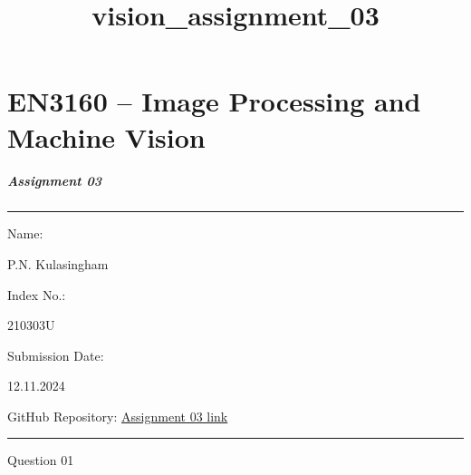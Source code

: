 \documentclass[11pt]{article}
\title{vision\_assignment\_03}
\begin{document}
    
    \maketitle
    
    

    
    \section{\texorpdfstring{\textbf{EN3160 -- Image Processing and Machine
Vision}}{EN3160 -- Image Processing and Machine Vision}}\label{en3160-image-processing-and-machine-vision}

\subparagraph{Assignment 03}\label{assignment-03}

\begin{center}\rule{0.5\linewidth}{0.5pt}\end{center}

Name:

{P.N. Kulasingham}

Index No.:

{210303U}

Submission Date:

{12.11.2024}

GitHub Repository:
\href{https://github.com/Pasindu-Nimsara-2002/Vision_assignment_03.git}{Assignment
03 link}

    \begin{center}\rule{0.5\linewidth}{0.5pt}\end{center}

Question 01
\end{document}
